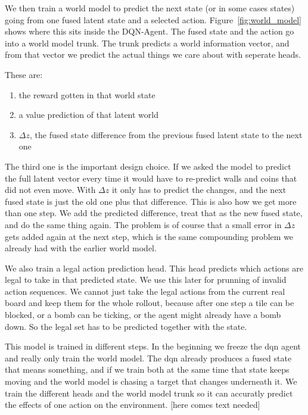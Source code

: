\documentclass[article, 10pt]{IEEEtran}
\begin{document}
We then train a world model to predict the next state (or in some cases states) going from one fused latent state and a selected action. Figure~\ref{fig:world_model} shows where this sits inside the DQN-Agent. The fused state and the action go into a world model trunk. The trunk predicts a world information vector, and from that vector we predict the actual things we care about with seperate heads.

These are:
\begin{enumerate}
    \item the reward gotten in that world state
    \item a value prediction of that latent world
    \item $\Delta z$, the fused state difference from the previous fused latent state to the next one
\end{enumerate}

The third one is the important design choice. If we asked the model to predict the full latent vector every time it would have to re-predict walls and coins that did not even move. With $\Delta z$ it only has to predict the changes, and the next fused state is just the old one plus that difference. This is also how we get more than one step. We add the predicted difference, treat that as the new fused state, and do the same thing again. The problem is of course that a small error in $\Delta z$ gets added again at the next step, which is the same compounding problem we already had with the earlier world model.

We also train a legal action prediction head. This head predicts which actions are legal to take in that predicted state. We use this later for prunning of invalid action sequences. We cannot just take the legal actions from the current real board and keep them for the whole rollout, because after one step a tile can be blocked, or a bomb can be ticking, or the agent might already have a bomb down. So the legal set has to be predicted together with the state.

This model is trained in different steps. In the beginning we freeze the dqn agent and really only train the world model. The dqn already produces a fused state that means something, and if we train both at the same time that state keeps moving and the world model is chasing a target that changes underneath it. We train the different heads and the world model trunk so it can accuratly predict the effects of one action on the environment. [here comes text needed]
\end{document}
